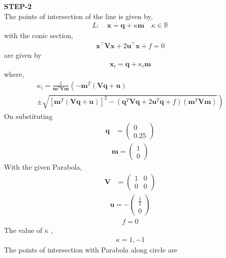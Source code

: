 \documentclass[10pt,a4paper]{report}
\newcommand{\myvec}[1]{\ensuremath{\begin{pmatrix}#1\end{pmatrix}}}
\let\vec\mathbf
\let\vec\mathbf
\providecommand{\brak}[1]{\ensuremath{\left(#1\right)}}
\providecommand{\lbrak}[1]{\ensuremath{\left(#1\right.}}
\providecommand{\rbrak}[1]{\ensuremath{\left.#1\right)}}
\providecommand{\sbrak}[1]{\ensuremath{{}\left[#1\right]}}
\begin{document}
\begin{multicols}{2}
\textbf{STEP-2}\vspace{2mm}\\
The points of intersection of the line is given by, \\ 
\begin{align}
L: \quad \vec{x} = \vec{q} + \kappa \vec{m} \quad \kappa \in \mathbb{R}
\end{align}
with the conic section, \\ 
\begin{align}
	\vec{x}^{\top}\vec{V}\vec{x} + 2\vec{u}^{\top} \vec{x} + f = 0
\end{align}
are given by \\
\begin{align}
\vec{x}_i = \vec{q} + \kappa_i \vec{m}
\end{align}
where, \\
{\tiny
\begin{multline}
\kappa_i = \frac{1}
{
\vec{m}^T\vec{V}\vec{m}
}
\lbrak{-\vec{m}^T\brak{\vec{V}\vec{q}+\vec{u}}}
\\
\pm
\rbrak{\sqrt{
\sbrak{
\vec{m}^T\brak{\vec{V}\vec{q}+\vec{u}}
}^2
-
\brak
{
\vec{q}^T\vec{V}\vec{q} + 2\vec{u}^T\vec{q} +f
}
\brak{\vec{m}^T\vec{V}\vec{m}}
}
}
\end{multline}
}
On substituting\\
\begin{align}
\vec{q} &= \myvec{
0\\
0.25
} 
\end{align}
\begin{align}
\vec{m} = \myvec{1 \\ 0}
\end{align}
With the given Parabola,\\ 
\begin{align}
	\vec{V} &= \myvec{
1 & 0\\
0 & 0
    }
\end{align}
\begin{align}
	\vec{u} = -\myvec{\frac{1}{2} \\0}
 \end{align}
 \begin{align}
  f = 0
 \end{align}
The value of $\kappa$ ,\\
\begin{align}
    \kappa = 1,-1
\end{align}
The points of intersection with Parabola along circle are \\
\begin{align}

\end{align}
\end{multicols}
\end{document}
